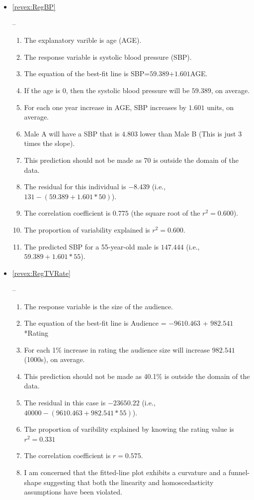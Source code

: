 \documentclass[10pt,openany]{book}\usepackage[]{graphicx}\usepackage[]{color}
\begin{document}
\begin{itemize}
  \item \hypertarget{ans:RegBP}{\ref{revex:RegBP}} --
    \begin{enumerate}
      \item The explanatory varible is age (AGE).
      \item The response variable is systolic blood pressure (SBP).
      \item The equation of the best-fit line is SBP=$59.389$+$1.601$AGE.
      \item If the age is 0, then the systolic blood pressure will be $59.389$, on average.
      \item For each one year increase in AGE, SBP increases by $1.601$ units, on average.
      \item Male A will have a SBP that is $4.803$ lower than Male B (This is just 3 times the slope).
      \item This prediction should not be made as 70 is outside the domain of the data.
      \item The residual for this individual is $-8.439$ (i.e., $131 - (59.389+1.601*50)$).
      \item The correlation coefficient is $0.775$ (the square root of the $r^{2}=0.600$).
      \item The proportion of variability explained is $r^{2}=0.600$.
      \item The predicted SBP for a 55-year-old male is $147.444$ (i.e., $59.389+1.601*55$).
    \end{enumerate}

  \item \hypertarget{ans:RegTVRate}{\ref{revex:RegTVRate}} --
    \begin{enumerate}
      \item The response variable is the size of the audience.
      \item The equation of the best-fit line is Audience = $-9610.463$ + $982.541$*Rating
      \item For each 1\% increase in rating the audience size will increase $982.541$ (1000s), on average.
      \item This prediction should not be made as 40.1\% is outside the domain of the data.
      \item The residual in this case is $-23650.22$ (i.e., $40000 - (9610.463 + 982.541*55)$).
      \item The proportion of varibility explained by knowing the rating value is $r^{2}=0.331$
      \item The correlation coefficient is $r=0.575$.
      \item I am concerned that the fitted-line plot exhibits a curvature and a funnel-shape suggesting that both the linearity and homoscedasticity assumptions have been violated.
    \end{enumerate}


\end{itemize}
\end{document}
